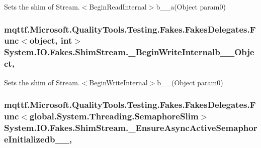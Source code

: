 Sets the shim of Stream.$<$Begin\-Read\-Internal$>$b\-\_\-\-\_\-a(\-Object param0)

\hypertarget{class_system_1_1_i_o_1_1_fakes_1_1_shim_stream_aa4c7c89f40b61fbade1e368cf7fe4d5a}{
\subsubsection[{\-\_\-\-Begin\-Write\-Internalb\-\_\-\-\_\-11\-Object}]{\setlength{\rightskip}{0pt plus 5cm}mqttf.\-Microsoft.\-Quality\-Tools.\-Testing.\-Fakes.\-Fakes\-Delegates.\-Func$<$object, int$>$ System.\-I\-O.\-Fakes.\-Shim\-Stream.\-\_\-\-Begin\-Write\-Internalb\-\_\-\-\_\-Object\hspace{0.3cm}{\ttfamily [static]}, {\ttfamily [set]}}}\label{class_system_1_1_i_o_1_1_fakes_1_1_shim_stream_aa4c7c89f40b61fbade1e368cf7fe4d5a}


Sets the shim of Stream.$<$Begin\-Write\-Internal$>$b\-\_\-\-\_(\-Object param0)

\hypertarget{class_system_1_1_i_o_1_1_fakes_1_1_shim_stream_aae69bbadba2395d8417ef2f47211a102}{
\subsubsection[{\-\_\-\-Ensure\-Async\-Active\-Semaphore\-Initializedb\-\_\-\-\_\-0}]{\setlength{\rightskip}{0pt plus 5cm}mqttf.\-Microsoft.\-Quality\-Tools.\-Testing.\-Fakes.\-Fakes\-Delegates.\-Func$<$global.\-System.\-Threading.\-Semaphore\-Slim$>$ System.\-I\-O.\-Fakes.\-Shim\-Stream.\-\_\-\-Ensure\-Async\-Active\-Semaphore\-Initializedb\-\_\-\-\_\hspace{0.3cm}{\ttfamily [static]}, {\ttfamily [set]}}}\label{class_system_1_1_i_o_1_1_fakes_1_1_shim_stream_aae69bbadba2395d8417ef2f47211a102}


